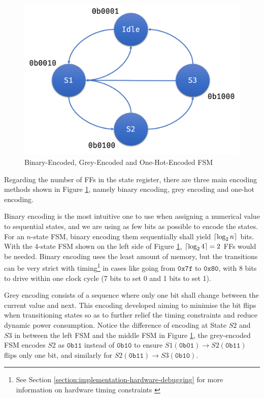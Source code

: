 \documentclass[a4paper]{report}
\DeclarePairedDelimiter\ceil{\lceil}{\rceil}
\begin{document}
\begin{figure}[h!]
\begin{minipage}{0.35\textwidth}
        \includegraphics[width=\linewidth]{imgs/one-hot-fsm.png}
    \end{minipage}
    \caption{Binary-Encoded, Grey-Encoded and One-Hot-Encoded FSM}
    \label{fig:binary-grey-one-hot-encoded-FSM}
\end{figure}

Regarding the number of FFs in the state register, there are three main encoding methods shown in Figure \ref{fig:binary-grey-one-hot-encoded-FSM}, namely binary encoding, grey encoding and one-hot encoding.

Binary encoding is the most intuitive one to use when assigning a numerical value to sequential states, and we are using as few bits as possible to encode the states. For an $n$-state FSM, binary encoding them sequentially shall yield $\ceil*{\log_2 n}$ bits. With the $4$-state FSM shown on the left side of Figure \ref{fig:binary-grey-one-hot-encoded-FSM}, $\ceil*{\log_2 4} = 2$ FFs would be needed. Binary encoding uses the least amount of memory, but the transitions can be very strict with timing\footnote{See Section \ref{section:implementation-hardware-debugging} for more information on hardware timing constraints \label{foot:timing-constraints}} in cases like going from $\mathtt{0x7f}$ to $\mathtt{0x80}$, with 8 bits to drive within one clock cycle (7 bits to set 0 and 1 bits to set 1).

Grey encoding consists of a sequence where only one bit shall change between the current value and next. This encoding developed aiming to minimise the bit flips when transitioning states so as to further relief the timing constraints and reduce dynamic power consumption. Notice the difference of encoding at State $S2$ and $S3$ in between the left FSM and the middle FSM in Figure \ref{fig:binary-grey-one-hot-encoded-FSM}, the grey-encoded FSM encodes $S2$ as $\mathtt{0b11}$ instead of $\mathtt{0b10}$ to ensure $S1 (\mathtt{0b01})\xrightarrow{}S2(\mathtt{0b11})$ flips only one bit, and similarly for $S2 (\mathtt{0b11})\xrightarrow{}S3(\mathtt{0b10})$.
\end{document}
